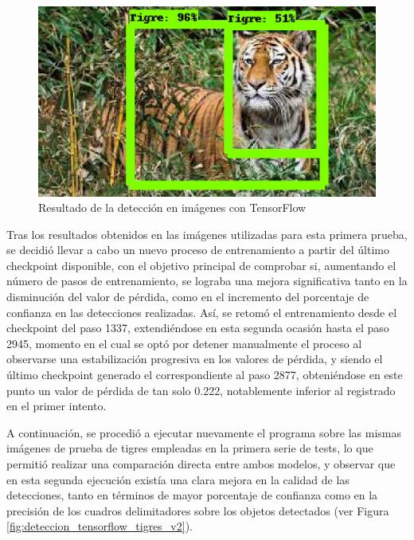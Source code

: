 \begin{figure}[H]
\begin{minipage}{0.46\textwidth}
  \end{minipage}
  \hspace{2mm}
  \begin{minipage}{0.46\textwidth}
    \centering
    \includegraphics[width=\linewidth]{figs/tigre_5.jpeg}
  \end{minipage}
  \caption{Resultado de la detección en imágenes con TensorFlow}
  \label{fig:deteccion_tensorflow_tigres}
  \end{figure}
 
Tras los resultados obtenidos en las imágenes utilizadas para esta primera prueba, se decidió llevar a cabo un nuevo proceso de entrenamiento a partir del último checkpoint disponible, con el objetivo principal de comprobar si, aumentando el número de pasos de entrenamiento, se lograba una mejora significativa tanto en la disminución del valor de pérdida, como en el incremento del porcentaje de confianza en las detecciones realizadas.
Así, se retomó el entrenamiento desde el checkpoint del paso 1337, extendiéndose en esta segunda ocasión hasta el paso 2945, momento en el cual se optó por detener manualmente el proceso al observarse una estabilización progresiva en los valores de pérdida, y siendo el último checkpoint generado el correspondiente al paso 2877, obteniéndose en este punto un valor de pérdida de tan solo 0.222, notablemente inferior al registrado en el primer intento. 

A continuación, se procedió a ejecutar nuevamente el programa sobre las mismas imágenes de prueba de tigres empleadas en la primera serie de tests, lo que permitió realizar una comparación directa entre ambos modelos, y observar que en esta segunda ejecución existía una clara mejora en la calidad de las detecciones, tanto en términos de mayor porcentaje de confianza como en la precisión de los cuadros delimitadores sobre los objetos detectados (ver Figura \ref{fig:deteccion_tensorflow_tigres_v2}).

